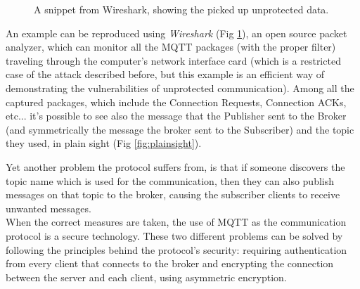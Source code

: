 \documentclass[target=bach,aauheader=,style=]{thud}
\begin{document}
\begin{figure}[h!]
	\centering
	\caption{A snippet from Wireshark, showing the picked up unprotected data.}
	\label{fig:wireshark1}
\end{figure}
\newpage
An example can be reproduced using \emph{Wireshark} (Fig \ref{fig:wireshark1}), an open source packet analyzer, which can monitor all the MQTT packages (with the proper filter) traveling through the computer's network interface card (which is a restricted case of the attack described before, but this example is an efficient way of demonstrating the vulnerabilities of unprotected communication).
Among all the captured packages, which include the Connection Requests, Connection ACKs, etc... it's possible to see also the message that the Publisher sent to the Broker (and symmetrically the message the broker sent to the Subscriber) and the topic they used,  in plain sight (Fig \ref{fig:plainsight}).

Yet another problem the protocol suffers from, is that if someone discovers the topic name which is used for the communication, then they can also publish messages on that topic to the broker, causing the subscriber clients to receive unwanted messages.\\

When the correct measures are taken, the use of MQTT as the communication protocol is a secure technology.
These two different problems can be solved by  following the principles behind the protocol's security: requiring authentication from every client that connects to the broker and encrypting the connection between the server and each client, using asymmetric encryption.
\end{document}
